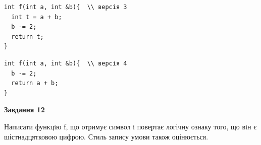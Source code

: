 \documentclass[12pt, ukrainian]{article}
\begin{document}
{\begin {large}
\begin{minipage}[t]{11.0cm}
\vspace{-8mm}\begin{verbatim}
int f(int a, int &b){  \\ версія 3
  int t = a + b;
  b -= 2;
  return t;
}
\end{verbatim}

\vspace{-8mm}\begin{verbatim}
int f(int a, int &b){  \\ версія 4
  b -= 2;
  return a + b;
}
\end{verbatim}



\begin{center}
\textbf{Завдання 12}
\end{center}

Написати функцiю f, що отримує символ i повертає логічну ознаку того, що вiн є шістнадцятковою цифрою. Стиль запису умови також оцінюється.\par

\end{minipage}

\end {large}}
\newpage
\end{document}
